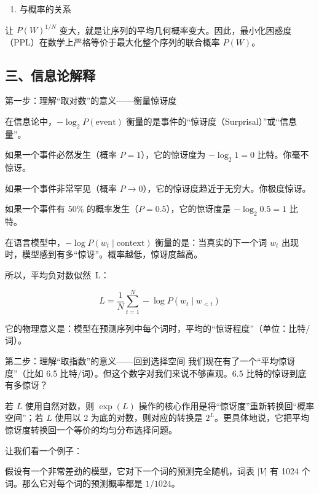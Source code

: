 \begin{enumerate}
\def\labelenumi{\arabic{enumi}.}
\setcounter{enumi}{5}
\tightlist
\item
  与概率的关系
\end{enumerate}

让 \(P(W)^{1/N}\) 变大，就是让序列的平均几何概率变大。因此，最小化困惑度（PPL）在数学上严格等价于最大化整个序列的联合概率 \(P(W)\)。

\hypertarget{ux4e09ux4fe1ux606fux8bbaux89e3ux91ca}{%
\subsection{三、信息论解释}\label{ux4e09ux4fe1ux606fux8bbaux89e3ux91ca}}

第一步：理解``取对数''的意义------衡量惊讶度

在信息论中，\(-\log_2 P(\mathrm{event})\) 衡量的是事件的``惊讶度（Surprisal）''或``信息量''。

如果一个事件必然发生（概率 \(P=1\)），它的惊讶度为 \(-\log_2 1=0\) 比特。你毫不惊讶。

如果一个事件非常罕见（概率 \(P\to 0\)），它的惊讶度趋近于无穷大。你极度惊讶。

如果一个事件有 50\% 的概率发生（\(P=0.5\)），它的惊讶度是 \(-\log_2 0.5=1\) 比特。

在语言模型中，\(-\log P(w_t\mid \mathrm{context})\) 衡量的是：当真实的下一个词 \(w_t\) 出现时，模型感到有多``惊讶''。概率越低，惊讶度越高。

所以，平均负对数似然~L：

\[
L=\frac{1}{N}\sum_{t=1}^{N}-\log P(w_t\mid w_{<t})
\]

它的物理意义是：模型在预测序列中每个词时，平均的``惊讶程度''（单位：比特/词）。

第二步：理解``取指数''的意义------回到选择空间
我们现在有了一个``平均惊讶度''（比如 6.5 比特/词）。但这个数字对我们来说不够直观。6.5 比特的惊讶到底有多惊讶？

若 \(L\) 使用自然对数，则 \(\exp(L)\) 操作的核心作用是将``惊讶度''重新转换回``概率空间''；若 \(L\) 使用以 2 为底的对数，则对应的转换是 \(2^L\)。更具体地说，它把平均惊讶度转换回一个等价的均匀分布选择问题。

让我们看一个例子：

假设有一个非常差劲的模型，它对下一个词的预测完全随机，词表 \(|V|\) 有 1024 个词。那么它对每个词的预测概率都是 \(1/1024\)。

